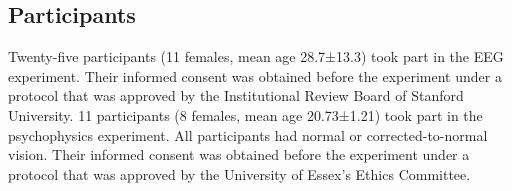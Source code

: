 \documentclass[9pt,twocolumn,twoside,lineno]{pnas-new}
\begin{document}







\subsection*{Participants}
Twenty-five participants (11 females, mean age 28.7±13.3) took part in the EEG experiment. Their informed consent was obtained before the experiment under a protocol that was approved by the Institutional Review Board of Stanford University. 11 participants (8 females, mean age 20.73±1.21) took part in the psychophysics experiment. All participants had normal or corrected-to-normal vision. Their informed consent was obtained before the experiment under a protocol that was approved by the University of Essex's Ethics Committee.
\end{document}
